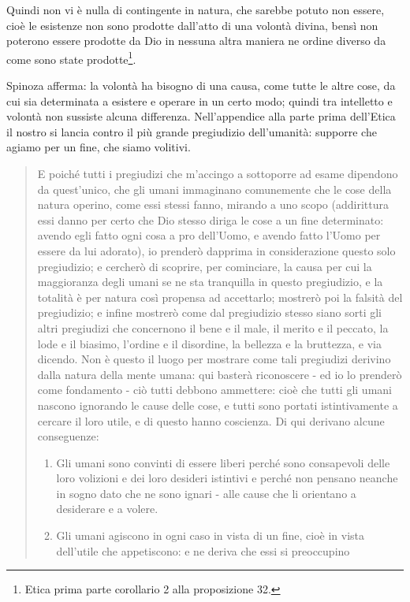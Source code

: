 Quindi non vi è nulla di contingente in natura, che sarebbe potuto non essere, cioè le esistenze non sono prodotte dall'atto di una volontà divina, bensì non poterono essere prodotte da Dio in nessuna altra maniera ne ordine diverso da come sono state prodotte\footnote{Etica prima parte corollario 2 alla proposizione 32.}.


Spinoza afferma: la volontà ha bisogno di una causa, come tutte le altre cose, da cui sia determinata a esistere e operare in un certo modo; quindi tra intelletto e volontà non sussiste alcuna differenza. Nell'appendice alla parte prima dell'Etica il nostro si lancia contro il più grande pregiudizio dell'umanità: supporre che agiamo per un fine, che siamo volitivi.
\begin{quotation}
	\small E poiché
	tutti i pregiudizi che m’accingo a sottoporre ad esame dipendono da quest’unico, che gli
	umani immaginano comunemente che le cose della natura operino, come essi stessi fanno,
	mirando a uno scopo (addirittura essi danno per certo che Dio stesso diriga le cose a un fine determinato: avendo egli fatto ogni cosa a pro dell’Uomo, e avendo fatto l’Uomo per essere da lui adorato), io prenderò dapprima in considerazione questo solo pregiudizio; e cercherò di scoprire, per cominciare, la causa per cui la maggioranza degli umani se ne sta
	tranquilla in questo pregiudizio, e la totalità è per natura così propensa ad accettarlo; mostrerò poi la falsità del pregiudizio; e infine mostrerò come dal pregiudizio stesso
	siano sorti gli altri pregiudizi che concernono il bene e il male, il merito e il peccato, la lode
	e il biasimo, l’ordine e il disordine, la bellezza e la bruttezza, e via dicendo. Non è questo il
	luogo per mostrare come tali pregiudizi derivino dalla natura della mente umana: qui basterà riconoscere - ed io lo prenderò come fondamento - ciò tutti debbono ammettere: cioè
	che tutti gli umani nascono ignorando le cause delle cose, e tutti sono portati istintivamente a cercare il loro utile, e di questo hanno coscienza. Di qui derivano alcune conseguenze:
	\begin{enumerate}
		\item Gli umani sono convinti di essere liberi perché sono consapevoli delle loro volizioni e
		dei loro desideri istintivi e perché non pensano neanche in sogno dato che ne sono ignari -
		alle cause che li orientano a desiderare e a volere.
		\item Gli umani agiscono in ogni caso in vista di un fine, cioè in vista dell’utile che appetiscono: e ne deriva che essi si preoccupino

\end{enumerate}
\end{quotation}
